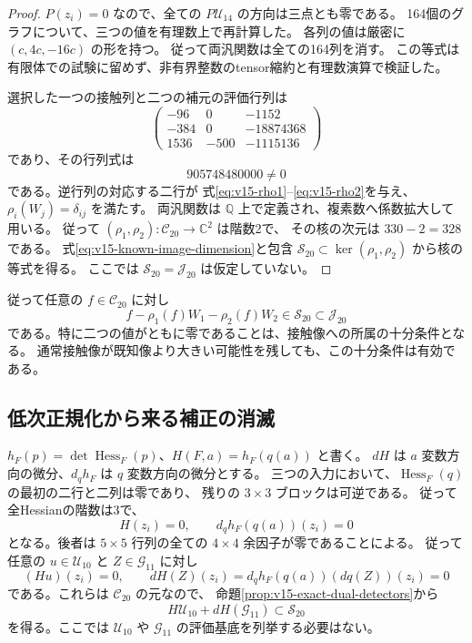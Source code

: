 \documentclass[a4paper,11pt]{ltjsarticle}
\theoremstyle{definition}
\begin{document}
\begin{proof}
$P(z_i)=0$ なので、全ての $P\mathcal U_{14}$ の方向は三点とも零である。
164個のグラフについて、三つの値を有理数上で再計算した。
各列の値は厳密に $(c,4c,-16c)$ の形を持つ。
従って両汎関数は全ての164列を消す。
この等式は有限体での試験に留めず、非有界整数のtensor縮約と有理数演算で検証した。

選択した一つの接触列と二つの補元の評価行列は
\[
 \begin{pmatrix}
 -96&0&-1152\\
 -384&0&-18874368\\
 1536&-500&-1115136
 \end{pmatrix}
\]
であり、その行列式は
\[
 905748480000\ne0
\]
である。逆行列の対応する二行が
式\eqref{eq:v15-rho1}--\eqref{eq:v15-rho2}を与え、
$\rho_i(W_j)=\delta_{ij}$ を満たす。
両汎関数は $\mathbb Q$ 上で定義され、複素数へ係数拡大して用いる。
従って $(\rho_1,\rho_2):\mathcal C_{20}\to\mathbb C^2$ は階数2で、
その核の次元は $330-2=328$ である。
式\eqref{eq:v15-known-image-dimension}と包含
$\mathcal S_{20}\subset\ker(\rho_1,\rho_2)$ から核の等式を得る。
ここでは $\mathcal S_{20}=\mathcal J_{20}$ は仮定していない。
\end{proof}

従って任意の $f\in\mathcal C_{20}$ に対し
\[
 f-\rho_1(f)W_1-\rho_2(f)W_2\in\mathcal S_{20}\subset\mathcal J_{20}
\]
である。特に二つの値がともに零であることは、接触像への所属の十分条件となる。
通常接触像が既知像より大きい可能性を残しても、この十分条件は有効である。

\subsection{低次正規化から来る補正の消滅}

$h_F(p)=\det\operatorname{Hess}_F(p)$、$H(F,a)=h_F(q(a))$ と書く。
$dH$ は $a$ 変数方向の微分、$d_qh_F$ は $q$ 変数方向の微分とする。
三つの入力において、$\operatorname{Hess}_F(q)$ の最初の二行と二列は零であり、
残りの $3\times3$ ブロックは可逆である。
従って全Hessianの階数は3で、
\[
 H(z_i)=0,\qquad d_qh_F(q(a))(z_i)=0
\]
となる。後者は $5\times5$ 行列の全ての $4\times4$ 余因子が零であることによる。
従って任意の $u\in\mathcal U_{10}$ と $Z\in\mathcal G_{11}$ に対し
\[
 (Hu)(z_i)=0,\qquad
 dH(Z)(z_i)=d_qh_F(q(a))(dq(Z))(z_i)=0
\]
である。これらは $\mathcal C_{20}$ の元なので、
命題\ref{prop:v15-exact-dual-detectors}から
\begin{equation}\label{eq:v15-hessian-secondary-in-known-image}
 H\mathcal U_{10}+dH(\mathcal G_{11})\subset\mathcal S_{20}
\end{equation}
を得る。ここでは $\mathcal U_{10}$ や $\mathcal G_{11}$ の評価基底を列挙する必要はない。
\end{document}
